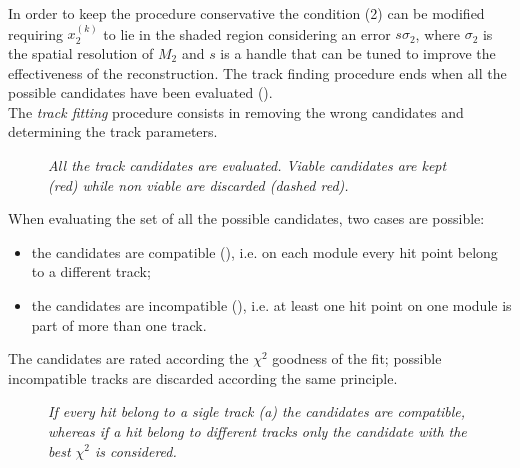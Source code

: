 In order to keep the procedure conservative the condition (2) can be modified
requiring $x_2^{(k)}$ to lie in the shaded region considering an error
$s\sigma_2$, where $\sigma_2$ is the spatial resolution of $M_2$ and $s$ is a
handle that can be tuned to improve the effectiveness of the reconstruction.
The track finding procedure ends when all the possible candidates have been
evaluated ().\\

The {\em track fitting} procedure consists in removing the wrong candidates and
determining the track parameters.
\begin{figure}[!htbp]
  \centering 
  
  \caption{\it All the track candidates are evaluated. Viable candidates are
    kept (red) while non viable are discarded (dashed red).}
  \label{fig:track_finding}
\end{figure} 
When evaluating the set of all the possible candidates, two cases are possible:
\begin{itemize}
\item the candidates are compatible (), i.e. on each
  module every hit point belong to a different track;
\item the candidates are incompatible (), i.e. at
  least one hit point on one module is part of more than one track.
\end{itemize}
The candidates are rated according the $\chi^2$ goodness of the fit; 
possible incompatible tracks are discarded according the same principle.\\
\begin{figure}[!htbp]
  \centering 
  \subfloat[]{  \label{fig:compatible_track} }\quad
  \subfloat[]{  \label{fig:incompatible_track} }
  \caption{\it If every hit belong to a sigle track (a) the candidates are
    compatible, whereas if a hit belong to different tracks only the candidate
    with the best $\chi^2$ is considered.}
  \label{fig:track_fitting}
\end{figure} 


